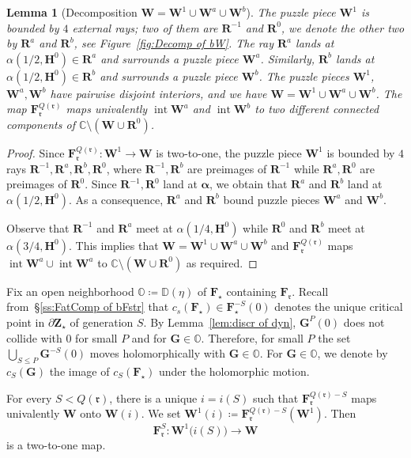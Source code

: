 \documentclass{amsart}
\newcommand{\1}{{\mathbb 1 }}
\newcommand{\bO}{{\mathbb{O}}}
\newcommand\intr{\operatorname{int}}
\newcommand{\bF}{{\mathbf F}}
\newcommand{\bZ}{{\mathbf Z}}
\newcommand{\bW}{{\mathbf W}}
\newcommand{\bR}{{\mathbf R}}
\newcommand{\bH}{{\mathbf H}}
\newcommand{\bG}{{\mathbf G}}
\newcommand{\str}{{\star}}
\newcommand{\rr}{\mathfrak{r}}
\newcommand{\C}{\mathbb{C}}
\newcommand{\Disk}{\mathbb{D}}
\newtheorem{lem}[thm]{Lemma}
\theoremstyle{remark}
\numberwithin{equation}{section}
\theoremstyle{definition}
\newcommand{\balpha}{{\boldsymbol \alpha}}
\theoremstyle{nonumberbreak}
\begin{document}
\begin{lem}[Decomposition $\bW=\bW^1\cup \bW^a\cup \bW^b$]
\label{lem:decomp:bW(bF)}
The puzzle piece $\bW^1$ is bounded by $4$ external rays; two of them are $\bR^{-1}$ and $\bR^{0}$, we denote the other two by $\bR^a$ and $\bR^b$, see Figure~\ref{fig:Decomp of bW}. The ray $\bR^a$ lands at $\alpha(1/2,\bH^0)\in \bR^a$ and surrounds a puzzle piece $\bW^a$. Similarly, $\bR^b$ lands at $\alpha(1/2,\bH^0)\in \bR^b$ and surrounds a puzzle piece $\bW^b$. The puzzle pieces $\bW^1$, $\bW^a, \bW^b$ have pairwise disjoint interiors, and we have $\bW=\bW^1\cup \bW^a\cup \bW^b$. The map $\bF_\rr^{Q(\rr)}$ maps univalently $\intr \bW^a$ and $\intr \bW^b$ to two different connected components of $\C\setminus (\bW\cup \bR^{0})$.
\end{lem}
\begin{proof}
Since $\bF_\rr^{Q(\rr)}\colon \bW^1\to \bW$ is two-to-one, the puzzle piece $ \bW^1$ is bounded by $4$ rays $\bR^{-1}, \bR^a,\bR^b,\bR^0$, where $\bR^{-1}, \bR^b$ are preimages of $\bR^{-1}$ while $\bR^a,\bR^0$ are preimages of $\bR^0$. Since $\bR^{-1},\bR^0$ land at $\balpha$, we obtain that $\bR^a$ and $\bR^b$ land at $\alpha(1/2,\bH^0)$. As a consequence, $\bR^a$ and $\bR^b$ bound puzzle pieces $\bW^a$ and $\bW^b$. 

Observe that $\bR^{-1}$ and $\bR^a$ meet at $\alpha(1/4,\bH^0)$ while  $\bR^0$ and $\bR^b$ meet at $\alpha(3/4,\bH^0)$. This implies that $\bW=\bW^1\cup \bW^a\cup \bW^b$ and $\bF^{Q(\rr)}_\rr$ maps $\intr \bW^a\cup \intr \bW^a$ to $\C\setminus  (\bW\cup \bR^{0})$ as required.
\end{proof}



Fix an open neighborhood $\bO\coloneqq \Disk(\eta)$ of $\bF_\str$ containing $\bF_\rr$. Recall from~\S\ref{ss:FatComp of bFstr}  that $c_s(\bF_\str)\in \bF_\str^{-S}(0)$ denotes the unique critical point in $\partial \bZ_\str$ of generation $S$.  By Lemma~\ref{lem:discr of dyn}, $\bG^P(0)$ does not collide with $0$ for small $P$ and for $\bG\in \bO$. Therefore, for small $P$ the set $\displaystyle{\bigcup_{S\le P} \bG^{-S}(0)}$ moves holomorphically with $\bG\in \bO$. For $\bG\in \bO$, we denote by $c_S(\bG)$ the image of $c_S(\bF_\str)$ under the holomorphic motion. 
 

For every $S<Q(\rr)$, there is a unique $i=i(S)$ such that $\bF^{Q(\rr)-S}_\rr$ maps univalently $ \bW$ onto $\bW(i)$. We set $\bW^1(i)\coloneqq \bF_\rr ^{Q(\rr)-S}(\bW^1)$. Then 
\begin{equation}
\label{eq:bW^1 i to bW}
\bF^S_\rr\colon \bW^1\big(i(S)\big) \to \bW
\end{equation} is a two-to-one map. 
 
\end{document}
